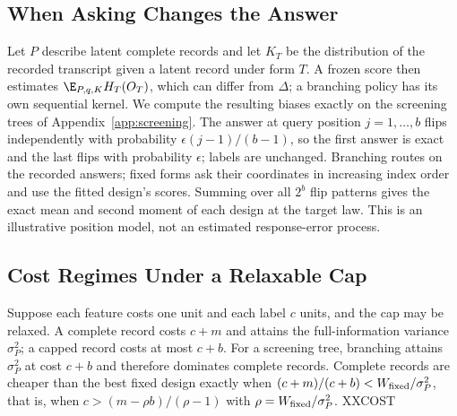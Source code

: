 \subsection{When Asking Changes the Answer}\label{app:measurement}
Let $P$ describe latent complete records and let $K_T$ be the distribution of the recorded transcript given a latent record under form $T$. A frozen score then estimates $\E_{P,q,K}H_T(O_T)$, which can differ from $\Delta$; a branching policy has its own sequential kernel. We compute the resulting biases exactly on the screening trees of Appendix~\ref{app:screening}. The answer at query position $j=1,\ldots,b$ flips independently with probability $\epsilon(j-1)/(b-1)$, so the first answer is exact and the last flips with probability $\epsilon$; labels are unchanged. Branching routes on the recorded answers; fixed forms ask their coordinates in increasing index order and use the fitted design's scores. Summing over all $2^b$ flip patterns gives the exact mean and second moment of each design at the target law. This is an illustrative position model, not an estimated response-error process.


\subsection{Cost Regimes Under a Relaxable Cap}\label{app:costchoice}
Suppose each feature costs one unit and each label $c$ units, and the cap may be relaxed. A complete record costs $c+m$ and attains the full-information variance $\sigma_P^2$; a capped record costs at most $c+b$. For a screening tree, branching attains $\sigma_P^2$ at cost $c+b$ and therefore dominates complete records. Complete records are cheaper than the best fixed design exactly when $(c+m)/(c+b)<W_{\rm fixed}/\sigma_P^2$, that is, when $c>(m-\rho b)/(\rho-1)$ with $\rho=W_{\rm fixed}/\sigma_P^2$. XXCOST
